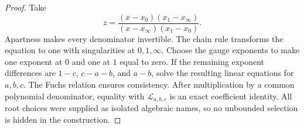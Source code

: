 \begin{proof}
Take
\[
 z=\frac{(x-x_0)(x_1-x_\infty)}
          {(x-x_\infty)(x_1-x_0)}.
\]
Apartness makes every denominator invertible.  The chain rule transforms the
equation to one with singularities at \(0,1,\infty\).  Choose the gauge
exponents to make one exponent at \(0\) and one at \(1\) equal to zero.  If
the remaining exponent differences are \(1-c\), \(c-a-b\), and \(a-b\),
solve the resulting linear equations for \(a,b,c\).  The Fuchs relation
ensures consistency.  After multiplication by a common polynomial
denominator, equality with \(\mathcal L_{a,b,c}\) is an exact coefficient
identity.  All root choices were supplied as isolated algebraic names, so no
unbounded selection is hidden in the construction.
\end{proof}
